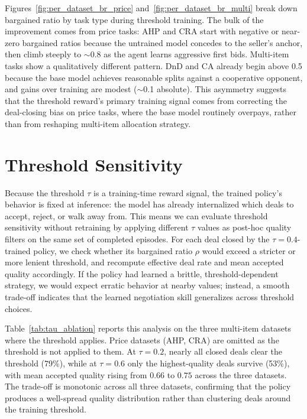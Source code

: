 \documentclass[11pt]{article}
\begin{document}
Figures~\ref{fig:per_dataset_br_price} and~\ref{fig:per_dataset_br_multi} break down bargained ratio by task type during threshold training. The bulk of the improvement comes from price tasks: AHP and CRA start with negative or near-zero bargained ratios because the untrained model concedes to the seller's anchor, then climb steeply to ${\sim}0.8$ as the agent learns aggressive first bids. Multi-item tasks show a qualitatively different pattern. DnD and CA already begin above 0.5 because the base model achieves reasonable splits against a cooperative opponent, and gains over training are modest (${\sim}$0.1 absolute). This asymmetry suggests that the threshold reward's primary training signal comes from correcting the deal-closing bias on price tasks, where the base model routinely overpays, rather than from reshaping multi-item allocation strategy.

\section{Threshold Sensitivity}
\label{app:tau}

Because the threshold $\tau$ is a training-time reward signal, the trained policy's behavior is fixed at inference: the model has already internalized which deals to accept, reject, or walk away from. This means we can evaluate threshold sensitivity without retraining by applying different $\tau$ values as post-hoc quality filters on the same set of completed episodes. For each deal closed by the $\tau{=}0.4$-trained policy, we check whether its bargained ratio $\rho$ would exceed a stricter or more lenient threshold, and recompute effective deal rate and mean accepted quality accordingly. If the policy had learned a brittle, threshold-dependent strategy, we would expect erratic behavior at nearby values; instead, a smooth trade-off indicates that the learned negotiation skill generalizes across threshold choices.

Table~\ref{tab:tau_ablation} reports this analysis on the three multi-item datasets where the threshold applies. Price datasets (AHP, CRA) are omitted as the threshold is not applied to them. At $\tau{=}0.2$, nearly all closed deals clear the threshold (79\%), while at $\tau{=}0.6$ only the highest-quality deals survive (53\%), with mean accepted quality rising from $0.66$ to $0.75$ across the three datasets. The trade-off is monotonic across all three datasets, confirming that the policy produces a well-spread quality distribution rather than clustering deals around the training threshold.
\end{document}

